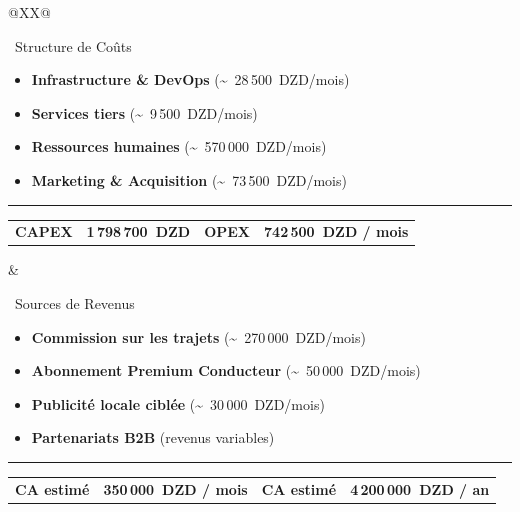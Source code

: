 \begin{landscape}
\begin{tabularx}{\linewidth}{@{}XX@{}}%
\begin{bmcblock}[height=4.2cm]{\faCoins~Structure de Coûts}%
\scriptsize
\begin{itemize}[leftmargin=1.5em, itemsep=1pt, parsep=0pt, topsep=2pt, partopsep=0pt]
  \item \textbf{Infrastructure \& DevOps} (\textasciitilde~28\,500~DZD/mois)
  \item \textbf{Services tiers} (\textasciitilde~9\,500~DZD/mois)
  \item \textbf{Ressources humaines} (\textasciitilde~570\,000~DZD/mois)
  \item \textbf{Marketing \& Acquisition} (\textasciitilde~73\,500~DZD/mois)
\end{itemize}
\vspace*{\fill}
\hrule
\vspace{0.1cm}
\centering
\begin{tabular}{l@{~:~}l@{\qquad\qquad}l@{~:~}l}
\textcolor{bmcgreen}{\textbf{CAPEX}} & \textbf{1\,798\,700~DZD} &
\textcolor{bmcgreen}{\textbf{OPEX}} & \textbf{742\,500~DZD / mois}
\end{tabular}
\end{bmcblock} &%
\begin{bmcblock}[height=4.2cm]{\faMoneyBillWave~Sources de Revenus}%
\scriptsize
\begin{itemize}[leftmargin=1.5em, itemsep=1pt, parsep=0pt, topsep=2pt, partopsep=0pt]
  \item \textbf{Commission sur les trajets} (\textasciitilde~270\,000~DZD/mois)
  \item \textbf{Abonnement Premium Conducteur} (\textasciitilde~50\,000~DZD/mois)
  \item \textbf{Publicité locale ciblée} (\textasciitilde~30\,000~DZD/mois)
  \item \textbf{Partenariats B2B} (revenus variables)
\end{itemize}
\vspace*{\fill}
\hrule
\vspace{0.1cm}
\centering
\begin{tabular}{l@{~:~}l@{\qquad\qquad}l@{~:~}l}
\textcolor{bmcgreen}{\textbf{CA estimé}} & \textbf{350\,000~DZD / mois} &
\textcolor{bmcgreen}{\textbf{CA estimé}} & \textbf{4\,200\,000~DZD / an}
\end{tabular}
\end{bmcblock} \\
\end{tabularx}

\vspace*{\fill}
\end{landscape}
\restoregeometry

